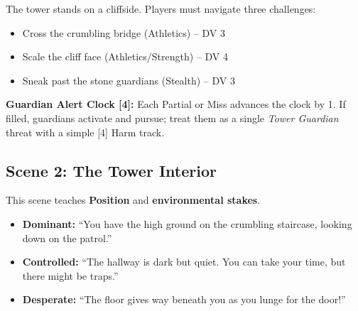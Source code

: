 The tower stands on a cliffside. Players must navigate three challenges:
\begin{itemize}
\item Cross the crumbling bridge (Athletics) – DV 3
\item Scale the cliff face (Athletics/Strength) – DV 4  
\item Sneak past the stone guardians (Stealth) – DV 3
\end{itemize}

\textbf{Guardian Alert Clock [4]:} Each Partial or Miss advances the clock by 1. If filled, guardians activate and pursue; treat them as a single \emph{Tower Guardian} threat with a simple [4] Harm track.

\subsection*{Scene 2: The Tower Interior}
\label{subsec:sunstone-interior}
This scene teaches \textbf{Position} and \textbf{environmental stakes}.

\begin{itemize}
\item \textbf{Dominant:} “You have the high ground on the crumbling staircase, looking down on the patrol.”
\item \textbf{Controlled:} “The hallway is dark but quiet. You can take your time, but there might be traps.”
\item \textbf{Desperate:} “The floor gives way beneath you as you lunge for the door!”
\end{itemize}

